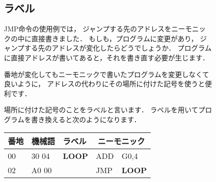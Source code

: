\begin{figure}[btp]
\begin{framed}
\subsection*{ラベル}
JMP命令の使用例では，
ジャンプする先のアドレスをニーモニックの中に直接書きました．
もしも，プログラムに変更があり，
ジャンプする先のアドレスが変化したらどうでしょうか．
プログラムに直接アドレスが書いてあると，それを書き直す必要が生じます．

番地が変化してもニーモニックで書いたプログラムを変更しなくて良いように，
アドレスの代わりにその場所に付けた記号を使うと便利です．

場所に付けた記号のことをラベルと言います．
ラベルを用いてプログラムを書き換えると次のようになります．

{\tt\small\begin{center}
\begin{tabular}{|l|l|l|l l|} \hline
番地 & 機械語 & ラベル & \multicolumn{2}{|c|}{ニーモニック} \\
\hline
00 & 30 04 & {\bf LOOP} & ADD  & G0,4          \\
02 & A0 00 &            & JMP  & {\bf LOOP}    \\
\hline
\end{tabular}
\end{center}}
\end{framed}
\end{figure}

